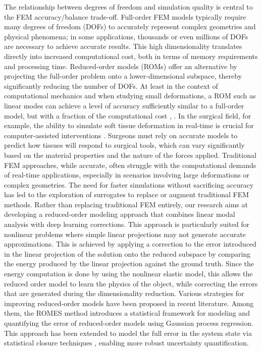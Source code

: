 The relationship between degrees of freedom and simulation quality is central to the FEM accuracy/balance trade-off. Full-order FEM models typically require many degrees of freedom (DOFs) to accurately represent complex geometries and physical phenomena; in some applications, thousands or even millions of DOFs are necessary to achieve accurate results. This high dimensionality translates directly into increased computational cost, both in terms of memory requirements and processing time. Reduced-order models (ROMs) \cite{ROM_Quarteroni} offer an alternative by projecting the full-order problem onto a lower-dimensional subspace, thereby significantly reducing the number of DOFs. At least in the context of computational mechanics and when studying small deformations, a ROM such as linear modes \cite{Pentland_Williams_1989} can achieve a level of accuracy sufficiently similar to a full-order model, but with a fraction of the computational cost \cite{Fulton_Modi_Duvenaud_Levin_Jacobson_2019}, \cite{Duenser_Thomaszewski_Poranne_Coros_2022}.
%
In the surgical field, for example, the ability to simulate soft tissue deformation in real-time is crucial for computer-assisted interventions \cite{petit:hal-01930366}. Surgeons must rely on accurate models to predict how tissues will respond to surgical tools, which can vary significantly based on the material properties and the nature of the forces applied. Traditional FEM approaches, while accurate, often struggle with the computational demands of real-time applications, especially in scenarios involving large deformations or complex geometries. The need for faster simulations without sacrificing accuracy has led to the exploration of surrogates to replace or augment traditional FEM methods. 
Rather than replacing traditional FEM entirely, our research aims at developing a reduced-order modeling approach that combines linear modal analysis with deep learning corrections. This approach is particularly suited for nonlinear problems where simple linear projections may not generate accurate approximations. This is achieved by applying a correction to the error introduced in the linear projection of the solution onto the reduced subspace by comparing the energy produced by the linear projection against the ground truth. Since the energy computation is done by using the nonlinear elastic model, this allows the reduced order model to learn the physics of the object, while correcting the errors that are generated during the dimensionality reduction. Various strategies for improving reduced-order models have been proposed in recent literature. Among them, the ROMES method \cite{Drohmann_Carlberg_2015} introduces a statistical framework for modeling and quantifying the error of reduced-order models using Gaussian process regression. This approach has been extended to model the full error in the system state via statistical closure techniques \cite{Pagani_Manzoni_Carlberg_2019}, enabling more robust uncertainty quantification. 

